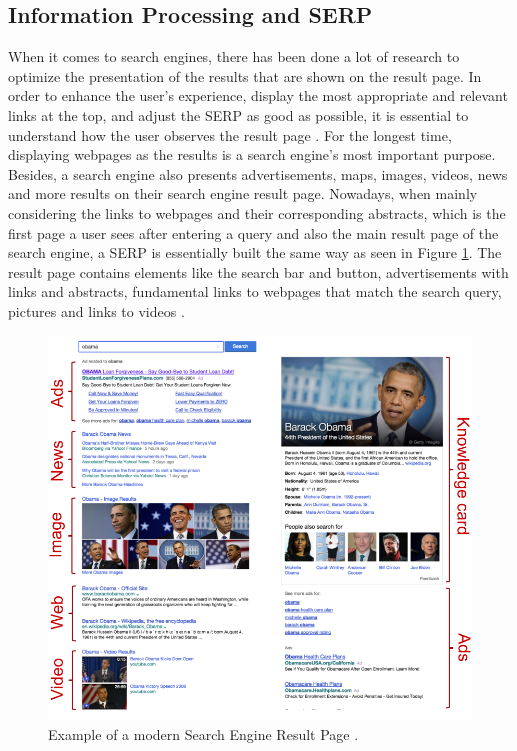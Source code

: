 \subsection{Information Processing and SERP}
\label{subsection:ReadingSERP}
When it comes to search engines, there has been done a lot of research to optimize the presentation of the results that are shown on the result page.  In order to enhance the user's experience, display the most appropriate and relevant links at the top, and adjust the SERP as good as possible, it is essential to understand how the user observes the result page \autocite{buscher2010good, liu2015influence}.
For the longest time, displaying webpages as the results is a search engine's most important purpose. Besides, a search engine also presents advertisements, maps, images, videos, news and more results on their search engine result page. Nowadays, when mainly considering the links to webpages and their corresponding abstracts, which is the first page a user sees after entering a query and also the main result page of the search engine, a SERP is essentially built the same way as seen in Figure \ref{figure:ModernSerp}.
The result page contains elements like the search bar and button, advertisements with links and abstracts, fundamental links to webpages that match the search query, pictures and links to videos \autocite{wang2016beyond}.

\begin{figure}[!ht]
    \centering
    \includegraphics[width=1\linewidth]{images/SERP_wang2016beyond.png}
    \caption{
        Example of a modern Search Engine Result Page \autocite[104]{wang2016beyond}.
    }
    \label{figure:ModernSerp}
\end{figure}

